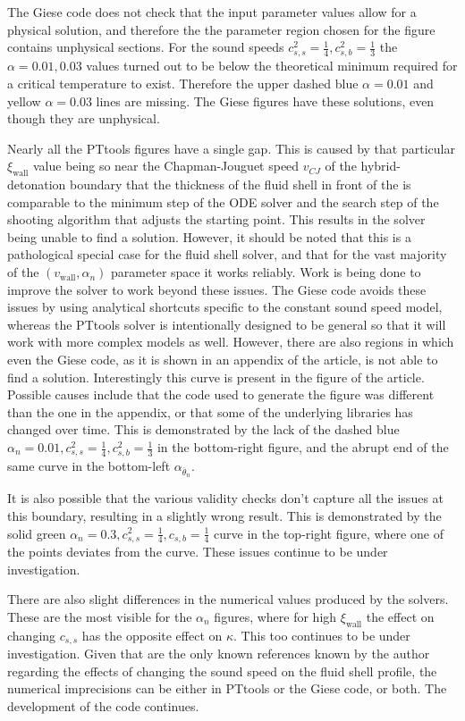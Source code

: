 The Giese code does not check that the input parameter values allow for a physical solution,
and therefore the the parameter region chosen for the figure contains unphysical sections.
For the sound speeds $c_{s,s}^2 = \frac{1}{4}, c_{s,b}^2 = \frac{1}{3}$ the $\alpha = 0.01, 0.03$ values turned out to be below the theoretical minimum
required for a critical temperature to exist.
Therefore the upper dashed blue $\alpha = 0.01$ and yellow $\alpha = 0.03$ lines are missing.
The Giese figures have these solutions, even though they are unphysical.

Nearly all the PTtools figures have a single gap.
This is caused by that particular $\xi_\text{wall}$ value being so near the Chapman-Jouguet speed $v_{CJ}$ of the hybrid-detonation boundary
that the thickness of the fluid shell in front of the is comparable to the minimum step of the ODE solver
and the search step of the shooting algorithm that adjusts the starting point.
This results in the solver being unable to find a solution.
However, it should be noted that this is a pathological special case for the fluid shell solver,
and that for the vast majority of the $(v_\text{wall}, \alpha_n)$ parameter space it works reliably.
Work is being done to improve the solver to work beyond these issues.
The Giese code avoids these issues by using analytical shortcuts specific to the constant sound speed model,
whereas the PTtools solver is intentionally designed to be general so that it will work with more complex models as well.
However, there are also regions in which even the Giese code, as it is shown in an appendix of the article, is not able to find a solution.
Interestingly this curve is present in the figure of the article.
Possible causes include that the code used to generate the figure was different than the one in the appendix,
or that some of the underlying libraries has changed over time.
This is demonstrated by the lack of the dashed blue $\alpha_n = 0.01, c_{s,s}^2 = \frac{1}{4}, c_{s,b}^2 = \frac{1}{3}$ in the bottom-right figure,
and the abrupt end of the same curve in the bottom-left $\alpha_{\bar{\theta}_n}$.

It is also possible that the various validity checks don't capture all the issues at this boundary,
resulting in a slightly wrong result.
This is demonstrated by the solid green $\alpha_n = 0.3, c_{s,s}^2 = \frac{1}{4}, c_{s,b} = \frac{1}{4}$ curve in the top-right figure,
where one of the points deviates from the curve.
These issues continue to be under investigation.

There are also slight differences in the numerical values produced by the solvers.
These are the most visible for the $\alpha_n$ figures, where for high $\xi_\text{wall}$ the effect on changing $c_{s,s}$ has the opposite effect on $\kappa$.
This too continues to be under investigation.
Given that \cites{giese_2020}{giese_2021} are the only known references known by the author regarding the effects of changing the sound speed on the fluid shell profile,
the numerical imprecisions can be either in PTtools or the Giese code, or both.
The development of the code continues.

